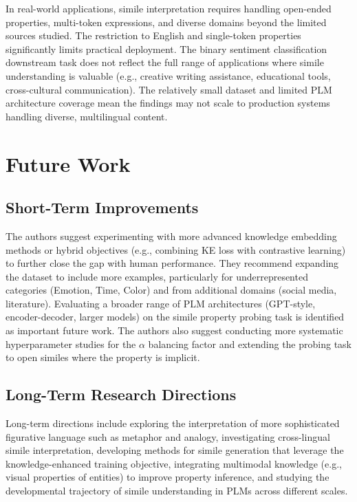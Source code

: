 \documentclass[12pt]{article}
\begin{document}
In real-world applications, simile interpretation requires handling open-ended properties, multi-token expressions, and diverse domains beyond the limited sources studied. The restriction to English and single-token properties significantly limits practical deployment. The binary sentiment classification downstream task does not reflect the full range of applications where simile understanding is valuable (e.g., creative writing assistance, educational tools, cross-cultural communication). The relatively small dataset and limited PLM architecture coverage mean the findings may not scale to production systems handling diverse, multilingual content.

\section{Future Work}

\subsection{Short-Term Improvements}

The authors suggest experimenting with more advanced knowledge embedding methods or hybrid objectives (e.g., combining KE loss with contrastive learning) to further close the gap with human performance. They recommend expanding the dataset to include more examples, particularly for underrepresented categories (Emotion, Time, Color) and from additional domains (social media, literature). Evaluating a broader range of PLM architectures (GPT-style, encoder-decoder, larger models) on the simile property probing task is identified as important future work. The authors also suggest conducting more systematic hyperparameter studies for the $\alpha$ balancing factor and extending the probing task to open similes where the property is implicit.

\subsection{Long-Term Research Directions}

Long-term directions include exploring the interpretation of more sophisticated figurative language such as metaphor and analogy, investigating cross-lingual simile interpretation, developing methods for simile generation that leverage the knowledge-enhanced training objective, integrating multimodal knowledge (e.g., visual properties of entities) to improve property inference, and studying the developmental trajectory of simile understanding in PLMs across different scales.
\end{document}
